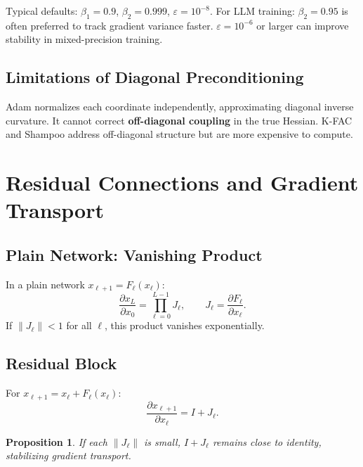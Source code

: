 \documentclass[12pt,a4paper]{article}
\newtheorem{proposition}{Proposition}[section]
\theoremstyle{definition}
\theoremstyle{remark}
\begin{document}
\begin{practbox}
Typical defaults: $\beta_1 = 0.9$, $\beta_2 = 0.999$, $\varepsilon = 10^{-8}$. For LLM training: $\beta_2 = 0.95$ is often preferred to track gradient variance faster. $\varepsilon = 10^{-6}$ or larger can improve stability in mixed-precision training.
\end{practbox}

\subsection{Limitations of Diagonal Preconditioning}

\begin{keybox}
Adam normalizes each coordinate independently, approximating diagonal inverse curvature. It cannot correct \textbf{off-diagonal coupling} in the true Hessian. K-FAC and Shampoo address off-diagonal structure but are more expensive to compute.
\end{keybox}

\section{Residual Connections and Gradient Transport}

\subsection{Plain Network: Vanishing Product}

In a plain network $x_{\ell+1} = F_\ell(x_\ell)$:
\[
\frac{\partial x_L}{\partial x_0} = \prod_{\ell=0}^{L-1} J_\ell, \qquad J_\ell = \frac{\partial F_\ell}{\partial x_\ell}.
\]
If $\|J_\ell\| < 1$ for all $\ell$, this product vanishes exponentially.

\subsection{Residual Block}

For $x_{\ell+1} = x_\ell + F_\ell(x_\ell)$:
\[
\frac{\partial x_{\ell+1}}{\partial x_\ell} = I + J_\ell.
\]

\begin{proposition}
If each $\|J_\ell\|$ is small, $I + J_\ell$ remains close to identity, stabilizing gradient transport.
\end{proposition}
\end{document}
